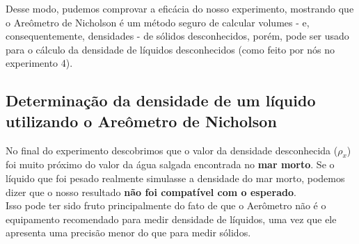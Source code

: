Desse modo, pudemos comprovar a eficácia do nosso experimento, mostrando que o Areômetro de Nicholson é um método seguro de calcular volumes - e, consequentemente, densidades - de sólidos desconhecidos, porém, pode ser usado para o cálculo da densidade de líquidos desconhecidos (como feito por nós no experimento 4).\\


\subsection{Determinação da densidade de um líquido utilizando o
Areômetro de Nicholson}

No final do experimento descobrimos que o valor da densidade desconhecida ($\rho _x$) foi muito próximo do valor da água salgada encontrada no \textbf{mar morto}. Se o líquido que foi pesado realmente simulasse a densidade do mar morto, podemos dizer que o nosso resultado \textbf{não foi compatível com o esperado}.\\

Isso pode ter sido fruto principalmente do fato de que o Aerômetro não é o equipamento recomendado para medir densidade de líquidos, uma vez que ele apresenta uma precisão menor do que para medir sólidos.


